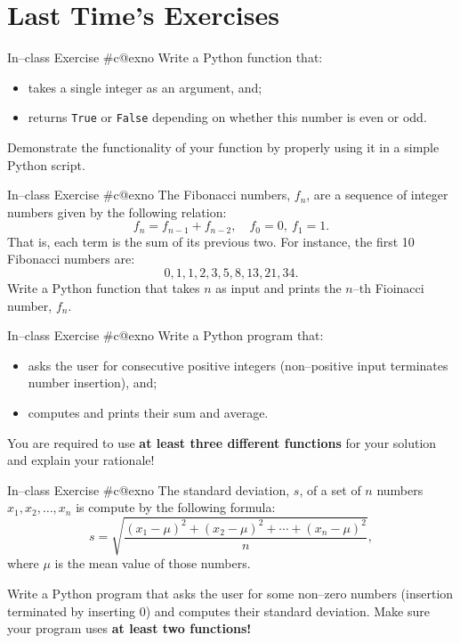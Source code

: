 \documentclass[aspectratio=169, 12pt, xcolor=table]{beamer}
\makeatletter
\newcommand{\arabicthree}[1]{\expandafter\@arabicthree\csname c@#1\endcsname}
\newcommand{\@arabicthree}[1]{\ifnum #1<100 0\fi\ifnum #1<10 0\fi\number#1}
\newcounter{exno}
\newcommand{\exno}{\stepcounter{exno}In--class Exercise \#\arabicthree{exno}}
\makeatother
\begin{document}
	\section{Last Time's Exercises}\label{sec:last-time-s-exercises}
	
	\sectionframe
	
	\setcounter{exno}{0}
	
	\begin{frame}{\exno}
		Write a Python function that:
		\begin{itemize}
			\item takes a single integer as an argument, and;
			\item returns \texttt{True} or \texttt{False} depending on whether this number is even or odd.
		\end{itemize}
		Demonstrate the functionality of your function by properly using it in a simple Python script.
	\end{frame}
	
	\begin{frame}{\exno}
		The Fibonacci numbers, $f_n$, are a sequence of integer numbers given by the following relation:
		\[f_n=f_{n-1}+f_{n-2},\quad f_0=0,\ f_1=1.\]
		That is, each term is the sum of its previous two. For instance, the first 10 Fibonacci numbers are:
		\[0,1,1,2,3,5,8,13,21,34.\]
		Write a Python function that takes $n$ as input and prints the $n$--th Fioinacci number, $f_n$.
	\end{frame}
	
	\begin{frame}{\exno}
		Write a Python program that:
		\begin{itemize}
			\item asks the user for consecutive positive integers (non--positive input terminates number insertion), and;
			\item computes and prints their sum and average.
		\end{itemize}
		You are required to use \textbf{at least three different functions} for your solution and explain your rationale!
	\end{frame}
	
	\begin{frame}{\exno}
		The standard deviation, $s$, of a set of $n$ numbers $x_1,x_2,\ldots,x_n$ is compute by the following formula:
		\[s=\sqrt{\frac{(x_1-\mu)^2+(x_2-\mu)^2+\cdots+(x_n-\mu)^2}{n}},\]
		where $\mu$ is the mean value of those numbers.
		
		Write a Python program that asks the user for some non--zero numbers (insertion terminated by inserting 0) and computes their standard deviation. Make sure your program uses \textbf{at least two functions!}
	\end{frame}
	
\end{document}
